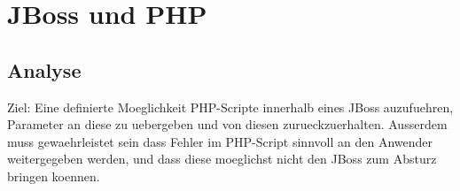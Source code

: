 \chapter{JBoss und PHP}
\label{sec:chap2}


\section{Analyse}
\label{sec:chap2:analysis}
Ziel: Eine definierte Moeglichkeit PHP-Scripte innerhalb eines JBoss 
        auzufuehren, Parameter an diese zu uebergeben und von diesen
                zurueckzuerhalten. Ausserdem muss gewaehrleistet sein dass Fehler im
                        PHP-Script sinnvoll an den Anwender weitergegeben werden, und dass
                                diese moeglichst nicht den JBoss zum Absturz bringen koennen.





